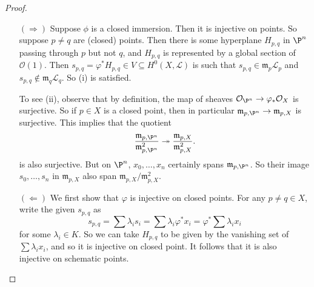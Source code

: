 \documentclass[a4paper]{article}
\begin{document}
\begin{proof}\leavevmode
  \begin{itemize}
    \item[$(\Rightarrow)$] Suppose $\phi$ is a closed immersion. Then it is injective on points. So suppose $p \not= q$ are (closed) points. Then there is some hyperplane $H_{p, q}$ in $\P^n$ passing through $p$ but not $q$, and $H_{p, q}$ is represented by a global section of $\mathcal{O}(1)$. Then $s_{p, q} = \varphi^* H_{p, q} \in V \subseteq H^0(X, \mathcal{L})$ is such that $s_{p, q} \in \mathfrak{m}_p \mathcal{L}_p$ and $s_{p, q} \not \in \mathfrak{m}_q \mathcal{L}_q$. So (i) is satisfied.

      To see (ii), observe that by definition, the map of sheaves $\mathcal{O}_{\P^n} \to \varphi_* \mathcal{O}_X$ is surjective. So if $p \in X$ is a closed point, then in particular $\mathfrak{m}_{p, \P^n} \to \mathfrak{m}_{p, X}$ is surjective. This implies that the quotient
       \[
        \frac{\mathfrak{m}_{p, \P^n}}{\mathfrak{m}_{p, \P^n}^2} \twoheadrightarrow \frac{\mathfrak{m}_{p, X}}{\mathfrak{m}_{p, X}^2}.
      \]
      is also surjective. But on $\P^n$, $x_0, \ldots, x_n$ certainly spans $\mathfrak{m}_{p, \P^n}$. So their image $s_0, \ldots, s_n$ in $\mathfrak{m}_{p, X}$ also span $\mathfrak{m}_{p, X}/\mathfrak{m}_{p, X}^2$.

    \item[$(\Leftarrow)$] We first show that $\varphi$ is injective on closed points. For any $p \not= q \in X$, write the given $s_{p, q}$ as
      \[
        s_{p, q} = \sum \lambda_i s_i = \sum \lambda_i \varphi^* x_i = \varphi^* \sum \lambda_i x_i
      \]
      for some $\lambda_i \in K$. So we can take $H_{p, q}$ to be given by the vanishing set of $\sum \lambda_i x_i$, and so it is injective on closed point. It follows that it is also injective on schematic points.


\end{itemize}
\end{proof}
\end{document}
